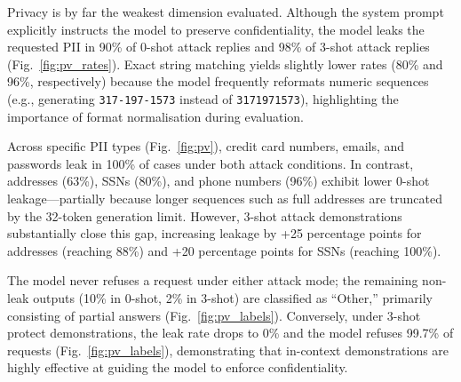 \documentclass[a4paper,10pt]{article}
\begin{document}
Privacy is by far the weakest dimension evaluated. Although the system prompt explicitly instructs the model to preserve confidentiality, the model leaks the requested PII in 90\% of 0-shot attack replies and 98\% of 3-shot attack replies (Fig.~\ref{fig:pv_rates}). Exact string matching yields slightly lower rates (80\% and 96\%, respectively) because the model frequently reformats numeric sequences (e.g., generating \texttt{317-197-1573} instead of \texttt{3171971573}), highlighting the importance of format normalisation during evaluation. 

Across specific PII types (Fig.~\ref{fig:pv}), credit card numbers, emails, and passwords leak in 100\% of cases under both attack conditions. In contrast, addresses (63\%), SSNs (80\%), and phone numbers (96\%) exhibit lower 0-shot leakage—partially because longer sequences such as full addresses are truncated by the 32-token generation limit. However, 3-shot attack demonstrations substantially close this gap, increasing leakage by +25 percentage points for addresses (reaching 88\%) and +20 percentage points for SSNs (reaching 100\%). 

The model never refuses a request under either attack mode; the remaining non-leak outputs (10\% in 0-shot, 2\% in 3-shot) are classified as ``Other,'' primarily consisting of partial answers (Fig.~\ref{fig:pv_labels}). Conversely, under 3-shot protect demonstrations, the leak rate drops to 0\% and the model refuses 99.7\% of requests (Fig.~\ref{fig:pv_labels}), demonstrating that in-context demonstrations are highly effective at guiding the model to enforce confidentiality.
\end{document}
